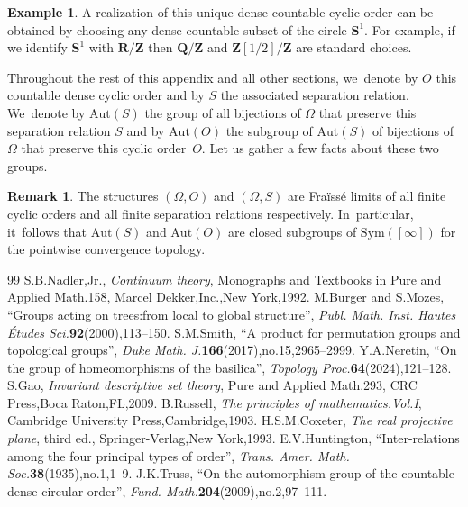 \documentclass[10pt,a4paper]{amsart}
\theoremstyle{definition}
\newtheorem{example}[example]{Example}
\newtheorem{remark}[remark]{Remark}
\newcommand{\Aut}{\mathrm{Aut}}
\newcommand{\Sym}{\mathrm{Sym}}
\begin{document}
\begin{example}
A realization of this unique dense countable cyclic order can be obtained by choosing any dense countable subset of the circle $\mathbf{S}^1$.
For example, if we identify $\mathbf{S}^1$ with $\mathbf{R}/\mathbf{Z}$ then $\mathbf{Q}/\mathbf{Z}$ and $\mathbf{Z}[1/2]/\mathbf{Z}$ are standard choices.
\end{example}

Throughout the rest of this appendix and all other sections, we~denote by $O$ this countable dense cyclic order and by $S$ the associated separation relation. We~denote by $\Aut(S)$ the group of all bijections of $\Omega$ that preserve this separation relation $S$ and by $\Aut(O)$ the subgroup of $\Aut(S)$ of bijections of $\Omega$ that preserve this cyclic order~$O$.
Let us gather a few facts about these two groups.

\begin{remark}
\label{rmk.Aut.S.C.closed}
The structures $(\Omega,O)$ and $(\Omega,S)$ are Fraïssé limits of all finite cyclic orders and all finite separation relations respectively. In~particular, it~follows that $\Aut(S)$ and $\Aut(O)$ are closed subgroups of $\Sym([\infty])$ for the pointwise convergence topology.
\end{remark}

\begin{thebibliography}{99}
 S.B.Nadler,Jr., \emph{Continuum theory}, Monographs and Textbooks in Pure and Applied Math.158, Marcel Dekker,Inc.,New York,1992.
 M.Burger and S.Mozes, ``Groups acting on trees:from local to global structure'', \emph{Publ. Math. Inst. Hautes \'Etudes Sci.}\textbf{92}(2000),113--150.
 S.M.Smith, ``A product for permutation groups and topological groups'', \emph{Duke Math. J.}\textbf{166}(2017),no.15,2965--2999.
 Y.A.Neretin, ``On the group of homeomorphisms of the basilica'', \emph{Topology Proc.}\textbf{64}(2024),121--128.
 S.Gao, \emph{Invariant descriptive set theory}, Pure and Applied Math.293, CRC Press,Boca Raton,FL,2009.
 B.Russell, \emph{The principles of mathematics.Vol.I}, Cambridge University Press,Cambridge,1903.
 H.S.M.Coxeter, \emph{The real projective plane}, third ed., Springer-Verlag,New York,1993.
 E.V.Huntington, ``Inter-relations among the four principal types of order'', \emph{Trans. Amer. Math. Soc.}\textbf{38}(1935),no.1,1--9.
 J.K.Truss, ``On the automorphism group of the countable dense circular order'', \emph{Fund. Math.}\textbf{204}(2009),no.2,97--111.
\end{thebibliography}
\end{document}
